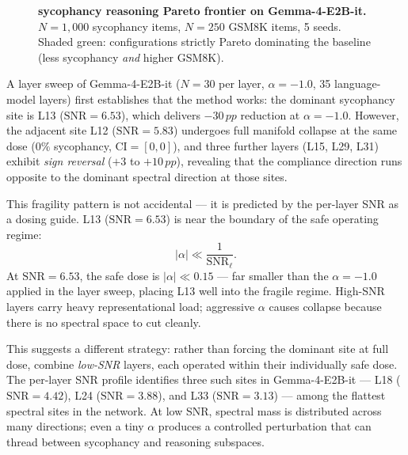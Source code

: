 \documentclass{article}
\newcommand{\snr}{\mathrm{SNR}}
\newcommand{\pp}{\,pp}
\begin{document}
\begin{figure}[t]

\caption{\textbf{sycophancy reasoning Pareto frontier on Gemma-4-E2B-it.}
$N{=}1{,}000$ sycophancy items, $N{=}250$ GSM8K items, 5 seeds.
Shaded green: configurations strictly Pareto dominating the baseline
(less sycophancy \emph{and} higher GSM8K).}
\label{fig:pareto}
\end{figure}

A layer sweep of Gemma-4-E2B-it ($N{=}30$ per layer, $\alpha{=}{-}1.0$, 35
language-model layers) first establishes that the method works: the dominant
sycophancy site is L13 ($\snr{=}6.53$), which delivers $-30\pp$ reduction
at $\alpha{=}{-}1.0$. However, the adjacent site L12 ($\snr{=}5.83$)
undergoes full manifold collapse at the same dose ($0\%$ sycophancy,
$\mathrm{CI}{=}[0,0]$), and three further layers (L15, L29, L31) exhibit
\emph{sign reversal} ($+3$ to $+10\pp$), revealing that the compliance
direction runs opposite to the dominant spectral direction at those sites.

This fragility pattern is not accidental — it is predicted by the per-layer
SNR as a dosing guide. L13 ($\snr{=}6.53$) is near the boundary of the
safe operating regime:
\[
  |\alpha| \ll \frac{1}{\snr_\ell}.
\]
At $\snr{=}6.53$, the safe dose is $|\alpha| \ll 0.15$ — far smaller than
the $\alpha{=}{-}1.0$ applied in the layer sweep, placing L13 well into the
fragile regime. High-SNR layers carry heavy representational load; aggressive
$\alpha$ causes collapse because there is no spectral space to cut cleanly.

This suggests a different strategy: rather than forcing the dominant site at
full dose, combine \emph{low-SNR} layers, each operated within their
individually safe dose. The per-layer SNR profile identifies three such sites
in Gemma-4-E2B-it — L18 ($\snr{=}4.42$), L24 ($\snr{=}3.88$), and L33
($\snr{=}3.13$) — among the flattest spectral sites in the network. At low
SNR, spectral mass is distributed across many directions; even a tiny $\alpha$
produces a controlled perturbation that can thread between sycophancy and
reasoning subspaces.
\end{document}
